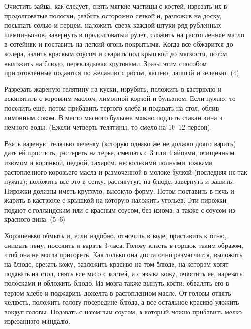 
Очистить зайца, как следует, снять мягкие частицы с костей, изрезать их в продолговатые полоски, разбить осторожно сечкой и, разложив на доску, посыпать солью и перцем, наложить сверх каждой штуки ряд рубленных шампиньонов, завернуть в продолговатый рулет, сложить на растопленное масло в сотейник и поставить на легкий огонь покрытыми. Когда все обжарится до колера, залить красным соусом и сварить под крышкой до мягкости, потом выложить на блюдо, перекладывая крутонами. Зразы этим способом приготовленные подаются по желанию с рисом, кашею, лапшой и зеленью. (4) 


Разрезать жареную телятину на куски, изрубить, положить в кастрюлю и вскипятить с коровьим маслом, лимонной коркой и бульоном. Если нужно, то посолить еще, потом прибавить тертого хлеба и подавать на стол, облив лимонным соком. В место мясного бульона можно подлить стакан вина и немного воды. (Ежели четверть телятины, то смело на 10--12 персон). 


Взять вареную телячью печенку (которую однако же не должно долго варить) дать ей простыть, растереть на терке, смешать с 3 или 4 яйцами, очищенным изюмом и коринкой, цедрой, сахаром, несколькими полными ложками растопленного коровьего масла и размоченной в молоке булкой (последняя не так нужна); положить все это в сетку, растянутую на блюде, завернуть и зашить. Пирожки должны иметь круглую, высокую форму. Потом поставить в печь и жарить в кастрюле с крышкой на которую наложить угольев. Эти пирожки подают с голландским или с красным соусом, без изюма, а также с соусом из красного вина. (5--6) 


Хорошенько обмыть и, если надобно, отмочить в воде, приставить к огню, снимать пену, посолить и варить 3 часа. Голову класть в горшок таким образом, чтоб она не могла пригореть. Как только она достаточно размягчится, выложить на блюдо, срезать кожу, разложить красиво на том блюде, на котором хотят подавать на стол, снять все мясо с костей, а с языка кожу, очистить ее, нарезать полосками и обложить блюдо. Из мозга также вынуть кости, обвалять его в тертом хлебе и поджарить дожелта в растопленном масле. От головы отнять челюсть, положить голову посередине блюда, а все остальное красиво уложить вокруг головы. Подавать с изюмным соусом, в который можно прибавить мелко изрезанного миндалю. 

